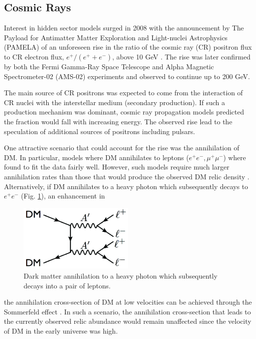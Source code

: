 \subsection{Cosmic Rays}

Interest in hidden sector models surged in 2008 with the announcement by 
The Payload for Antimatter Matter Exploration and Light-nuclei Astrophysics \\ 
(PAMELA) of an unforeseen rise in the ratio of the cosmic ray (CR) positron flux
to CR electron flux, $e^{+}/(e^{+} + e^{-})$, above 10 GeV \cite{pamela2008}.
The rise was later confirmed by both the 
Fermi Gamma-Ray Space Telescope \cite{ackermann2012} and Alpha Magnetic 
Spectrometer-02 (AMS-02) \cite{aguilar2013} experiments and observed to continue
up to 200 GeV. 

The main source of CR positrons 
was expected to come from the interaction of CR nuclei with the interstellar 
medium (secondary production).  If such a production mechanism was dominant, 
cosmic ray propagation models predicted the fraction would fall with increasing
energy.  The observed rise lead to the speculation of additional sources of 
positrons including pulsars\cite{yin2013, linden2013}.

One attractive scenario that could account for the rise was the annihilation of
DM.  In particular, models where DM annihilates to leptons ($e^+e^-, \mu^+\mu^-$)
where found to fit the data fairly well.  However, such models require much 
larger annihilation rates than those that would produce the observed
DM relic density \cite{cholis2009}. Alternatively, if DM annihilates
to a heavy photon which subsequently decays to $e^{+}e^{-}$ 
(Fig. \ref{fig:dm_annihilation}), an enhancement in
\begin{figure}[t]
    \centering
    \includegraphics[width=0.5\textwidth]{images/dm_annihilation.png}
    \caption{Dark matter annihilation to a heavy photon which subsequently 
             decays into a pair of leptons.}
    \label{fig:dm_annihilation}
\end{figure}
the annihilation cross-section of DM at low velocities can be achieved through
the Sommerfeld effect \cite{arkani-hamed2009}.  In such a scenario, the annihilation 
cross-section that leads to the currently observed relic abundance would remain
unaffected since the velocity of DM in the early universe was high. 

